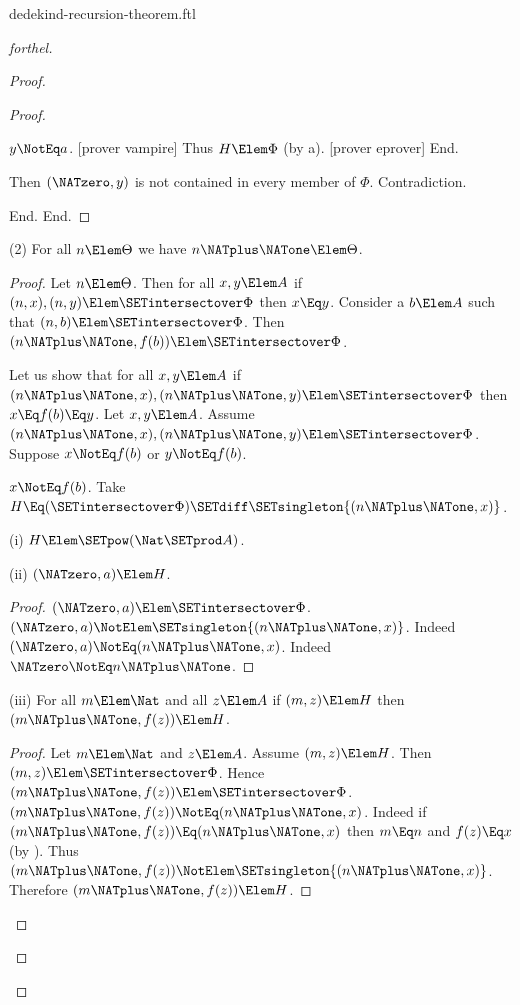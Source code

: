 \documentclass{stex}
\begin{document}
\begin{smodule}{dedekind-recursion-theorem.ftl}
\begin{proof}[forthel]
\begin{proof}
\begin{proof}
\begin{case}{$y \NotEq a$.}
              [prover vampire]
              Thus $H \Elem \Phi$ (by a).
              [prover eprover]
            End.

            Then $(\NATzero,y)$ is not contained in every member of $\Phi$.
            Contradiction.
          \end{case}
        End.
      End.
    \end{proof}

    (2) For all $n \Elem \Theta$ we have $n \NATplus \NATone \Elem \Theta$.
    \begin{proof}
      Let $n \Elem \Theta$.
      Then for all $x, y \Elem A$ if $(n, x), (n, y) \Elem \SETintersectover \Phi$ then
      $x \Eq y$.
      Consider a $b \Elem A$ such that $(n,b) \Elem \SETintersectover \Phi$.
      Then $(n \NATplus \NATone, f(b)) \Elem \SETintersectover \Phi$.

      Let us show that for all $x, y \Elem A$ if $(n \NATplus \NATone, x),
      (n \NATplus \NATone, y) \Elem \SETintersectover \Phi$ then $x \Eq f(b) \Eq y$.
        Let $x, y \Elem A$.
        Assume $(n \NATplus \NATone, x), (n \NATplus \NATone, y) \Elem \SETintersectover \Phi$.
        Suppose $x \NotEq f(b)$ or $y \NotEq f(b)$.

        \begin{case}{$x \NotEq f(b)$.}
          Take $H \Eq (\SETintersectover \Phi) \SETdiff \SETsingleton{(n \NATplus \NATone,x)}$.

          (i) $H \Elem \SETpow(\Nat \SETprod A)$.

          (ii) $(\NATzero,a) \Elem H$.
          \begin{proof}
            $(\NATzero,a) \Elem \SETintersectover \Phi$.
            $(\NATzero,a) \NotElem \SETsingleton{(n \NATplus \NATone,x)}$.
            Indeed $(\NATzero,a) \NotEq (n \NATplus \NATone,x)$.
            Indeed $\NATzero \NotEq n \NATplus \NATone$.
          \end{proof}

          (iii) For all $m \Elem \Nat$ and all $z \Elem A$ if $(m,z) \Elem H$ then $(m \NATplus \NATone,f(z)) \Elem H$.
          \begin{proof}
            Let $m \Elem \Nat$ and $z \Elem A$.
            Assume $(m,z) \Elem H$.
            Then $(m,z) \Elem \SETintersectover \Phi$.
            Hence $(m \NATplus \NATone,f(z)) \Elem \SETintersectover \Phi$.
            $(m \NATplus \NATone,f(z)) \NotEq (n \NATplus \NATone,x)$.
            Indeed if $(m \NATplus \NATone,f(z)) \Eq (n \NATplus \NATone,x)$ then $m \Eq n$ and $f(z) \Eq x$ (by ).
            Thus $(m \NATplus \NATone,f(z)) \NotElem \SETsingleton{(n \NATplus \NATone,x)}$.
            Therefore $(m \NATplus \NATone,f(z)) \Elem H$.
          \end{proof}


\end{case}
\end{proof}
\end{proof}
\end{proof}
\end{smodule}
\end{document}

